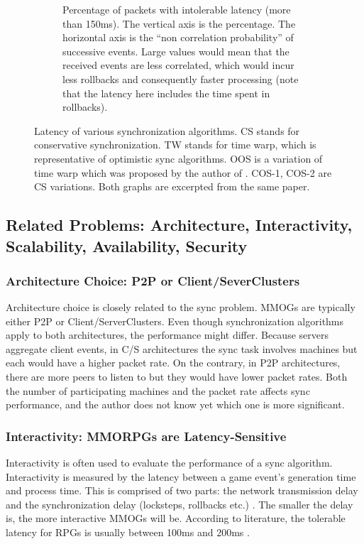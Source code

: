 \documentclass{article}
\begin{document}
\begin{figure}
\begin{center}
\begin{subfigure}[b]{\textwidth}
\begin{center}
	\caption{Percentage of packets with intolerable latency (more than 150ms). The vertical axis is the percentage. The horizontal axis is the ``non correlation probability'' of successive events. Large values would mean that the received events are less correlated, which would incur less rollbacks and consequently faster processing (note that the latency here includes the time spent in rollbacks).}
	\label{fig:sapct}
	\end{center}
\end{subfigure}
\caption{Latency of various synchronization algorithms. CS stands for conservative synchronization. TW stands for time warp, which is representative of optimistic sync algorithms. OOS is a variation of time warp which was proposed by the author of \cite{Ferretti05}. COS-1, COS-2 are CS variations. Both graphs are excerpted from the same paper.}
\label{fig:sa}
\end{center}
\end{figure}


\subsection{Related Problems: Architecture, Interactivity, Scalability, Availability, Security}
\label{sec:rp}

\subsubsection{Architecture Choice: P2P or Client/SeverClusters}
\label{sec:arch}
Architecture choice is closely related to the sync problem. MMOGs are typically either P2P or Client/ServerClusters. Even though synchronization algorithms apply to both architectures, the performance might differ. Because servers aggregate client events, in C/S architectures the sync task involves machines but each would have a higher packet rate. On the contrary, in P2P architectures, there are more peers to listen to but they would have lower packet rates. Both the number of participating machines and the packet rate affects sync performance, and the author does not know yet which one is more significant.

\subsubsection{Interactivity: MMORPGs are Latency-Sensitive}
\label{sec:int}
Interactivity is often used to evaluate the performance of a sync algorithm. Interactivity is measured by the latency between a game event's generation time and process time. This is comprised of two parts: the network transmission delay and the synchronization delay (locksteps, rollbacks etc.) \cite{}. The smaller the delay is, the more interactive MMOGs will be. According to literature, the tolerable latency for RPGs is usually between 100ms and 200ms \cite{}.
\end{document}
